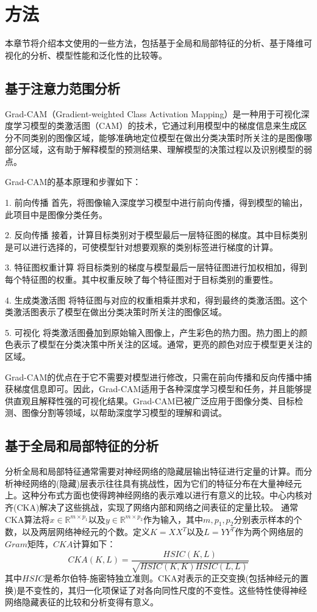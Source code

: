 \section{方法}

本章节将介绍本文使用的一些方法，包括基于全局和局部特征的分析、基于降维可视化的分析、模型性能和泛化性的比较等。

\subsection{基于注意力范围分析}

Grad-CAM（Gradient-weighted Class Activation Mapping）是一种用于可视化深度学习模型的类激活图（CAM）的技术，它通过利用模型中的梯度信息来生成区分不同类别的图像区域，能够准确地定位模型在做出分类决策时所关注的是图像哪部分区域，这有助于解释模型的预测结果、理解模型的决策过程以及识别模型的弱点。

Grad-CAM的基本原理和步骤如下：

1. 前向传播
首先，将图像输入深度学习模型中进行前向传播，得到模型的输出，此项目中是图像分类任务。

2. 反向传播
接着，计算目标类别对于模型最后一层特征图的梯度。其中目标类别是可以进行选择的，可使模型针对想要观察的类别标签进行梯度的计算。

3. 特征图权重计算
将目标类别的梯度与模型最后一层特征图进行加权相加，得到每个特征图的权重。其中权重反映了每个特征图对于目标类别的重要性。

4. 生成类激活图
将特征图与对应的权重相乘并求和，得到最终的类激活图。这个类激活图表示了模型在做出分类决策时所关注的图像区域。

5. 可视化
将类激活图叠加到原始输入图像上，产生彩色的热力图。热力图上的颜色表示了模型在分类决策中所关注的区域。通常，更亮的颜色对应于模型更关注的区域。

Grad-CAM的优点在于它不需要对模型进行修改，只需在前向传播和反向传播中捕获梯度信息即可。因此，Grad-CAM适用于各种深度学习模型和任务，并且能够提供直观且解释性强的可视化结果。Grad-CAM已被广泛应用于图像分类、目标检测、图像分割等领域，以帮助深度学习模型的理解和调试。
\subsection{基于全局和局部特征的分析}
分析全局和局部特征通常需要对神经网络的隐藏层输出特征进行定量的计算。而分析神经网络的(隐藏)层表示往往具有挑战性，因为它们的特征分布在大量神经元上。这种分布式方面也使得跨神经网络的表示难以进行有意义的比较。中心内核对齐(CKA)解决了这些挑战，实现了网络内部和网络之间表征的定量比较。
通常CKA算法将$x\in \mathbb{R}^{m\times p_{1}}$以及$y\in \mathbb{R}^{m\times p_{2}}$作为输入，其中$m,p_{1},p_{2}$分别表示样本的个数，以及两层网络神经元的个数。定义$K=XX^{T}$以及$L=YY^{T}$作为两个网络层的$Gram$矩阵，$CKA$计算如下：
$$CKA(K,L)=\frac{HSIC(K,L)}{\sqrt{HSIC(K,K)HSIC(L,L)} } $$其中$HSIC$是希尔伯特-施密特独立准则。CKA对表示的正交变换(包括神经元的置换)是不变性的，其归一化项保证了对各向同性尺度的不变性。这些特性使得神经网络隐藏表征的比较和分析变得有意义。

